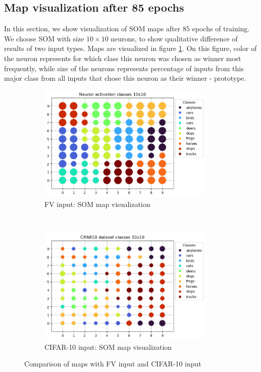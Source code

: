 \subsection{Map visualization after 85 epochs}
In this section, we show visualization of SOM maps after $85$ epochs of training. We choose SOM with size $10\times10$ neurons, to show qualitative difference of results of two input types. Maps are visualized in figure \ref{cifar10-fv-85ep}. On this figure, color of the neuron represents for which class this neuron was chosen as winner most frequently, while size of the neurons represents percentage of inputs from this major class from all inputs that chose this neuron as their winner - prototype.

\begin{figure}[h!]
    \centering
    \begin{subfigure}[t]{0.4\textwidth}
        \centering
        \includegraphics[height=2.2in]{figs/fv-10n-84ep.png}
        \caption{FV input: SOM map visualization}
    \end{subfigure}%
    ~ 
    \begin{subfigure}[t]{0.6\textwidth}
        \centering
        \includegraphics[height=2.2in]{figs/cifar10-10n-84ep-new.png}
        \caption{CIFAR-10 input: SOM map visualization}
    \end{subfigure}

    \caption{Comparison of maps with FV input and CIFAR-10 input}
    \label{cifar10-fv-85ep}
\end{figure}


